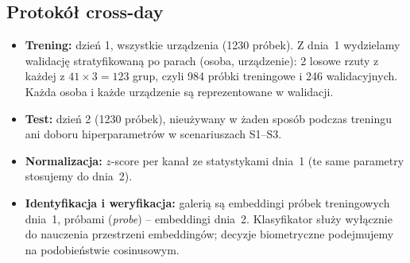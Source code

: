 \documentclass[11pt,a4paper]{article}
\begin{document}
\subsection{Protokół cross-day}\label{sec:protokol}
\begin{itemize}
  \item \textbf{Trening:} dzień 1, wszystkie urządzenia (1230 próbek). Z dnia~1 wydzielamy walidację
        stratyfikowaną po parach (osoba, urządzenie): 2 losowe rzuty z każdej z $41 \times 3 = 123$
        grup, czyli 984 próbki treningowe i 246 walidacyjnych. Każda osoba i każde urządzenie są
        reprezentowane w walidacji.
  \item \textbf{Test:} dzień 2 (1230 próbek), nieużywany w żaden sposób podczas treningu ani doboru
        hiperparametrów w scenariuszach S1--S3.
  \item \textbf{Normalizacja:} $z$-score per kanał ze statystykami dnia~1 (te same parametry
        stosujemy do dnia~2).
  \item \textbf{Identyfikacja i weryfikacja:} galerią są embeddingi próbek treningowych dnia~1,
        próbami (\emph{probe}) -- embeddingi dnia~2. Klasyfikator służy wyłącznie do nauczenia
        przestrzeni embeddingów; decyzje biometryczne podejmujemy na podobieństwie cosinusowym.
\end{itemize}
\end{document}
